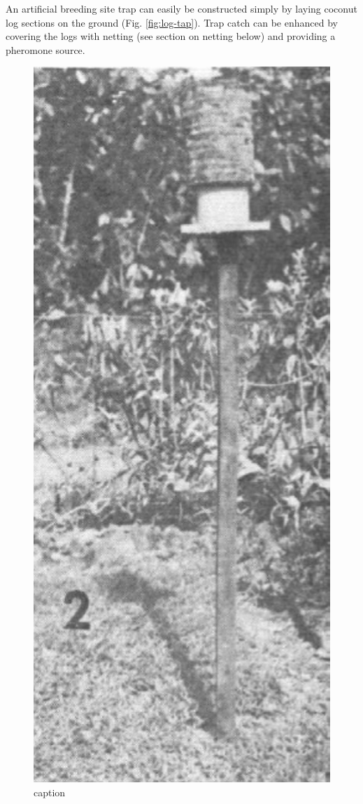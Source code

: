 \documentclass[twocolumn,letterpaper]{scrartcl}
\begin{document}
An artificial breeding site trap can easily be constructed simply by laying coconut log sections on the ground (Fig. \ref{fig:log-tap}). Trap catch can be enhanced by covering the logs with netting (see section on netting below) and providing a pheromone source.
\begin{figure}[h]
	\centering
	\includegraphics[width=0.7\linewidth]{images/hoyt-trap}
	\caption{caption}
	\label{fig:hoyt-trap}
\end{figure}
\end{document}
